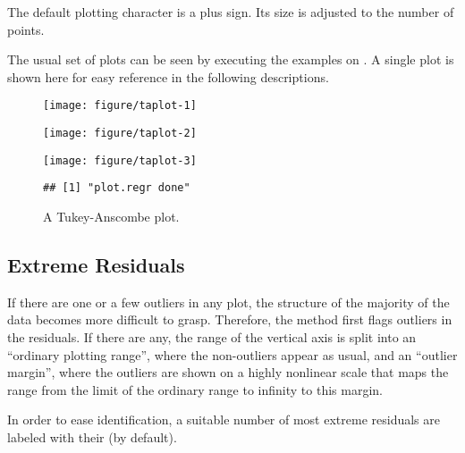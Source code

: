 \documentclass[11pt]{article}\usepackage[]{graphicx}\usepackage[]{color}
\makeatletter
\def\maxwidth{ %
  \ifdim\Gin@nat@width>\linewidth
    \linewidth
  \else
    \Gin@nat@width
  \fi
}
\newenvironment{kframe}{%
 \def\at@end@of@kframe{}%
 \ifinner\ifhmode%
  \def\at@end@of@kframe{\end{minipage}}%
  \begin{minipage}{\columnwidth}%
 \fi\fi%
 \def\FrameCommand##1{\hskip\@totalleftmargin \hskip-\fboxsep
 \colorbox{shadecolor}{##1}\hskip-\fboxsep
     \hskip-\linewidth \hskip-\@totalleftmargin \hskip\columnwidth}%
 \MakeFramed {\advance\hsize-\width
   \@totalleftmargin\z@ \linewidth\hsize
   \@setminipage}}%
 {\par\unskip\endMakeFramed%
 \at@end@of@kframe}
\newenvironment{knitrout}{}{} %
\makeatother
\begin{document}
The default plotting character is a plus sign. Its size is adjusted to
the number of points.

The usual set of plots can be seen by executing the examples on
. 
A single plot is shown here for easy reference in the following
descriptions. 

\begin{figure}[htb]
\begin{knitrout}
\color{fgcolor}\begin{kframe}


{\ttfamily\noindent\color{warningcolor}{\#\# Warning in plot.regr(r.blast, plotselect = c(resfit = 3, default = 0), xvars = F, : :plot.regr: Inadequate elements in plotselect: resfit, default}}\end{kframe}
\texttt{[image: figure/taplot-1]} 

\texttt{[image: figure/taplot-2]} 

\texttt{[image: figure/taplot-3]} 
\begin{kframe}\begin{verbatim}
## [1] "plot.regr done"
\end{verbatim}
\end{kframe}
\end{knitrout}
\caption{A Tukey-Anscombe plot.}
\end{figure}

\subsection{Extreme Residuals}
If there are one or a few outliers in any plot, the structure of the
majority of the data becomes more difficult to grasp. 
Therefore, the  method first flags outliers in the residuals.
If there are any, the range of the vertical axis is split into an
``ordinary plotting range'', where the non-outliers appear as usual, and
an ``outlier margin'', where the outliers are shown on a highly nonlinear
scale that maps the range from the limit of the ordinary range to infinity 
to this margin.

In order to ease identification, a suitable number of most extreme
residuals are labeled with their  (by default).

\end{document}
